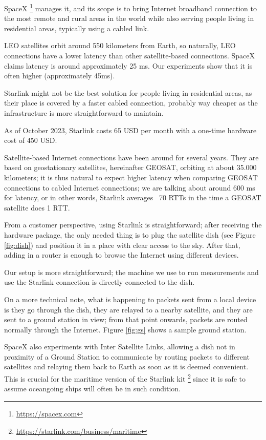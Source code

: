 \documentclass[IN,11pt,twoside,openright,idp,english]{tumthesis}
\begin{document}
SpaceX \footnote{\url{https://spacex.com}} manages it, and its scope is to bring Internet broadband connection to the most remote and rural areas in the world while also serving people living in residential areas, typically using a cabled link.
    
LEO satellites orbit around 550 kilometers from Earth, so naturally, LEO connections have a lower latency than other satellite-based connections. SpaceX claims latency is around approximately 25 ms. Our experiments show that it is often higher (approximately 45ms). 
    
Starlink might not be the best solution for people living in residential areas, as their place is covered by a faster cabled connection, probably way cheaper as the infrastructure is more straightforward to maintain. 
    
As of October 2023, Starlink costs 65 USD per month with a one-time hardware cost of 450 USD. 
    
Satellite-based Internet connections have been around for several years. They are based on geostationary satellites, hereinafter GEOSAT, orbiting at about 35.000 kilometers; it is thus natural to expect higher latency when comparing GEOSAT connections to cabled Internet connections; we are talking about around 600 ms for latency, or in other words, Starlink averages ~70 RTTs in the time a GEOSAT satellite does 1 RTT.
    
From a customer perspective, using Starlink is straightforward; after receiving the hardware package, the only needed thing is to plug the satellite dish (see Figure \ref{fig:dish}) and position it in a place with clear access to the sky. After that, adding in a router is enough to browse the Internet using different devices. 

Our setup is more straightforward; the machine we use to run measurements and use the Starlink connection is directly connected to the dish.
    
On a more technical note, what is happening to packets sent from a local device is they go through the dish, they are relayed to a nearby satellite, and they are sent to a ground station in view; from that point onwards, packets are routed normally through the Internet. Figure \ref{fig:gs} shows a sample ground station.
    
SpaceX also experiments with Inter Satellite Links, allowing a dish not in proximity of a Ground Station to communicate by routing packets to different satellites and relaying them back to Earth as soon as it is deemed convenient. This is crucial for the maritime version of the Starlink kit \footnote{\url{https://starlink.com/business/maritime}} since it is safe to assume oceangoing ships will often be in such condition.
\end{document}
